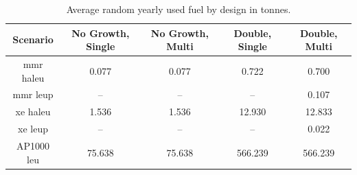 \begin{table}[H]
    \centering
    \caption{Average random yearly used fuel by design in tonnes.}
    \label{tab:random_used_avg}
    \begin{tabular}{c c c c c}
       \hline
       Scenario & No Growth, Single & No Growth, Multi & Double, Single & Double, Multi  \\
       \hline
       \gls{mmr} \gls{haleu}   & 0.077    & 0.077   & 0.722    & 0.700    \\
       \gls{mmr} \gls{leup}    & --       & --      & --       & 0.107    \\
       \gls{xe} \gls{haleu}    & 1.536    & 1.536   & 12.930   & 12.833   \\
       \gls{xe} \gls{leup}     & --       & --      & --       & 0.022    \\
       AP1000 \gls{leu}        & 75.638   & 75.638  & 566.239  & 566.239  \\
       \hline
    \end{tabular}
\end{table}

